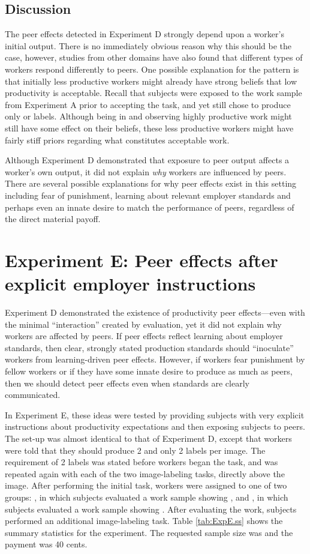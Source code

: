 \documentclass[12pt]{article}
\begin{document}
\subsection{Discussion}
The peer effects detected in Experiment D strongly depend upon a
worker's initial output. There is no immediately obvious reason why
this should be the case, however, studies from other domains have also
found that different types of workers respond differently to
peers. One possible explanation for the pattern is that initially less
productive workers might already have strong beliefs that low
productivity is acceptable. Recall that subjects were exposed to the
 work sample from Experiment A prior to accepting the task, and
yet still chose to produce only  or  labels. Although being in
 and observing highly productive work might still have some
effect on their beliefs, these less productive workers might have
fairly stiff priors regarding what constitutes acceptable work.

Although Experiment D demonstrated that exposure to peer output
affects a worker's own output, it did not explain \emph{why} workers
are influenced by peers.  There are several possible explanations for
why peer effects exist in this setting including fear of punishment,
learning about relevant employer standards and perhaps even an innate
desire to match the performance of peers, regardless of the direct
material payoff.

\section{Experiment E: Peer effects after explicit employer instructions} 
Experiment D demonstrated the existence of productivity peer
effects---even with the minimal ``interaction'' created by evaluation,
yet it did not explain why workers are affected by peers. If peer
effects reflect learning about employer standards, then clear,
strongly stated production standards should ``inoculate'' workers
from learning-driven peer effects. However, if workers fear punishment
by fellow workers or if they have some innate desire to produce as
much as peers, then we should detect peer effects even when standards
are clearly communicated.

In Experiment E, these ideas were tested by providing subjects with
very explicit instructions about productivity expectations and then
exposing subjects to peers. The set-up was almost identical to that of
Experiment D, except that workers were told that they should produce 2
and only 2 labels per image. The requirement of 2 labels was stated
before workers began the task, and was repeated again with each of the
two image-labeling tasks, directly above the image. After performing
the initial task, workers were assigned to one of two groups: , in
which subjects evaluated a work sample showing , and , in
which subjects evaluated a work sample showing . After
evaluating the work, subjects performed an additional image-labeling
task. Table \ref{tab:ExpE.ss} shows the summary statistics for
the experiment. The requested sample size was  and the payment
was 40 cents.
\end{document}
